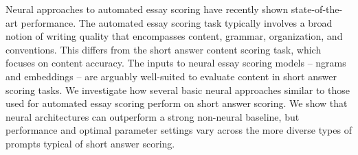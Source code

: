 Neural approaches to automated essay scoring have recently shown state-of-the-art performance. The automated essay scoring task typically involves a broad notion of writing quality that encompasses content, grammar, organization, and conventions. This differs from the short answer content scoring task, which focuses on content accuracy. The inputs to neural essay scoring models -- ngrams and embeddings -- are arguably well-suited to evaluate content in short answer scoring tasks. We investigate how several basic neural approaches similar to those used for automated essay scoring perform on short answer scoring. We show that neural architectures can outperform a strong non-neural baseline, but performance and optimal parameter settings vary across the more diverse types of prompts typical of short answer scoring.
